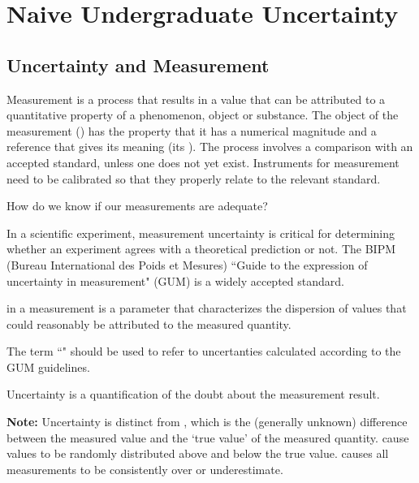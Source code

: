 \chapter{Naive Undergraduate Uncertainty}



\section{Uncertainty and Measurement}

Measurement is a process that results in a value that can be attributed to a quantitative property of a phenomenon, object or substance. The object of the measurement () has the property that it has a numerical magnitude and a reference that gives its meaning (its ). The process involves a comparison with an accepted standard, unless one does not yet exist. Instruments for measurement need to be calibrated so that they properly relate to the relevant standard.

\begin{qst}
    How do we know if our measurements are adequate? 
\end{qst}

In a scientific experiment, measurement uncertainty is critical for determining whether an experiment agrees with a theoretical prediction or not. The BIPM (Bureau International des Poids et Mesures) ``Guide to the expression of uncertainty in measurement" (GUM) is a widely accepted standard.

\begin{defn}
     in a measurement is a parameter that characterizes the dispersion of values that could reasonably be attributed to the measured quantity.

    The term ``" should be used to refer to uncertanties calculated according to the GUM guidelines.
\end{defn}

Uncertainty is a quantification of the doubt about the measurement result. 

\begin{rmk}
    \textbf{Note:} Uncertainty is distinct from , which is the (generally unknown) difference between the measured value and the `true value' of the measured quantity.  cause values to be randomly distributed above and below the true value.  causes all measurements to be consistently over or underestimate.
\end{rmk}

